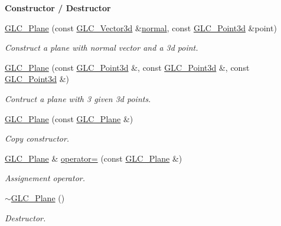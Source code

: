 \begin{Indent}{\bf Constructor / Destructor}
\begin{DoxyCompactItemize}
\hyperlink{class_g_l_c___plane_af7ceb4127305a19221ac7314af4330d8}{G\-L\-C\-\_\-\-Plane} (const \hyperlink{class_g_l_c___vector3d}{G\-L\-C\-\_\-\-Vector3d} \&\hyperlink{class_g_l_c___plane_aa06b8755a25fd36ef2dd8664a72c5152}{normal}, const \hyperlink{glc__vector3d_8h_a4e13a9bbc7ab3d34de7e98b41836772c}{G\-L\-C\-\_\-\-Point3d} \&point)
\begin{DoxyCompactList}\small\item\em Construct a plane with normal vector and a 3d point. \end{DoxyCompactList}\item 
\hyperlink{class_g_l_c___plane_aeef4be7be4cb3e2258083a2f89c2043a}{G\-L\-C\-\_\-\-Plane} (const \hyperlink{glc__vector3d_8h_a4e13a9bbc7ab3d34de7e98b41836772c}{G\-L\-C\-\_\-\-Point3d} \&, const \hyperlink{glc__vector3d_8h_a4e13a9bbc7ab3d34de7e98b41836772c}{G\-L\-C\-\_\-\-Point3d} \&, const \hyperlink{glc__vector3d_8h_a4e13a9bbc7ab3d34de7e98b41836772c}{G\-L\-C\-\_\-\-Point3d} \&)
\begin{DoxyCompactList}\small\item\em Contruct a plane with 3 given 3d points. \end{DoxyCompactList}\item 
\hyperlink{class_g_l_c___plane_aedb66f828110ee212d839e9819d3d9a2}{G\-L\-C\-\_\-\-Plane} (const \hyperlink{class_g_l_c___plane}{G\-L\-C\-\_\-\-Plane} \&)
\begin{DoxyCompactList}\small\item\em Copy constructor. \end{DoxyCompactList}\item 
\hyperlink{class_g_l_c___plane}{G\-L\-C\-\_\-\-Plane} \& \hyperlink{class_g_l_c___plane_a98c291d4527e740a2414ef2cdd13ca49}{operator=} (const \hyperlink{class_g_l_c___plane}{G\-L\-C\-\_\-\-Plane} \&)
\begin{DoxyCompactList}\small\item\em Assignement operator. \end{DoxyCompactList}\item 
\hyperlink{class_g_l_c___plane_a8fcaf27513102417edd7858f274ec226}{$\sim$\-G\-L\-C\-\_\-\-Plane} ()
\begin{DoxyCompactList}\small\item\em Destructor. \end{DoxyCompactList}\end{DoxyCompactItemize}
\end{Indent}
